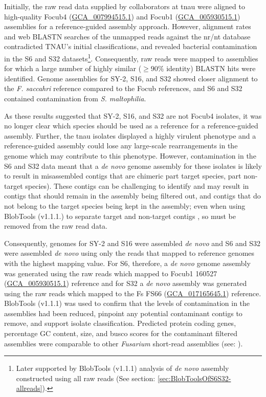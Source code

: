 Initially, the raw read data supplied by collaborators at \ac{tnau} were aligned to high-quality \ac{Focub4} (\href{https://www.ncbi.nlm.nih.gov/datasets/genome/GCA_007994515.1/}{GCA\_007994515.1}) and \ac{Focub1} (\href{https://www.ncbi.nlm.nih.gov/datasets/genome/GCA_005930515.1/}{GCA\_005930515.1})  assemblies for a reference-guided assembly approach. However, alignment rates and web BLASTN searches of the unmapped reads against the nr/nt database contradicted TNAU's initial classifications, and revealed bacterial contamination in the S6 and S32 datasets\footnote{Later supported by BlobTools (v1.1.1) analysis of \textit{de novo} assembly constructed using all raw reads (See section: \ref{sec:BlobToolsOfS6S32-allreads}).}. Consequently, raw reads were  mapped to assemblies for which a large number of highly similar ($ \geq90\% $ identity) BLASTN hits were identified. Genome assemblies for SY-2, S16, and S32 showed closer alignment to the \textit{F. saccahri} reference compared to the \ac{Focub} references, and S6 and S32 contained contamination from \textit{S. maltophilia}. 

As these results suggested that SY-2, S16, and S32 are not \ac{Focub4} isolates, it was no longer clear which species should be used as a reference for a reference-guided assembly. Further, the \ac{tnau} isolates displayed a highly virulent phenotype and a reference-guided assembly could lose any large-scale rearrangements in the genome which may contribute to this phenotype. However, contamination in the S6 and S32 data meant that a \textit{de novo} genome assembly for these isolates is likely to result in misassembled contigs that are chimeric part target species, part non-target species). These contigs can be challenging to identify and may result in contigs that should remain in the assembly being filtered out, and contigs that do not belong to the target species being kept in the assembly; even when using BlobTools (v1.1.1.) to separate target and non-target contigs \parencite{Cornet2022}, so must be removed from the raw read data. 

Consequently, genomes for SY-2 and S16 were assembled \textit{de novo} and S6 and S32 were assembled \textit{de novo} using only the reads that mapped to reference genomes with the highest mapping value. For S6, therefore, a \textit{de novo} genome assembly was generated using the raw reads which mapped to \ac{Focub1} 160527 (\href{https://www.ncbi.nlm.nih.gov/datasets/genome/GCA_005930515.1/}{GCA\_005930515.1}) reference and for S32 a \textit{de novo} assembly was generated using the raw reads which mapped to the \ac{Fs} FS66 (\href{https://www.ncbi.nlm.nih.gov/datasets/genome/GCA_017165645.1/}{GCA\_017165645.1}) reference. BlobTools (v1.1.1) was used to confirm that the levels of contamination in the assemblies had been reduced, pinpoint any potential contaminant contigs to remove, and support isolate classification. Predicted protein coding genes, percentage GC content, size, and \ac{busco} scores for the contaminant filtered assemblies were comparable to other \textit{Fusarium} short-read assemblies (see: \textcite{DitaHerai2013, Chiara2015, Srivastava2018}).

